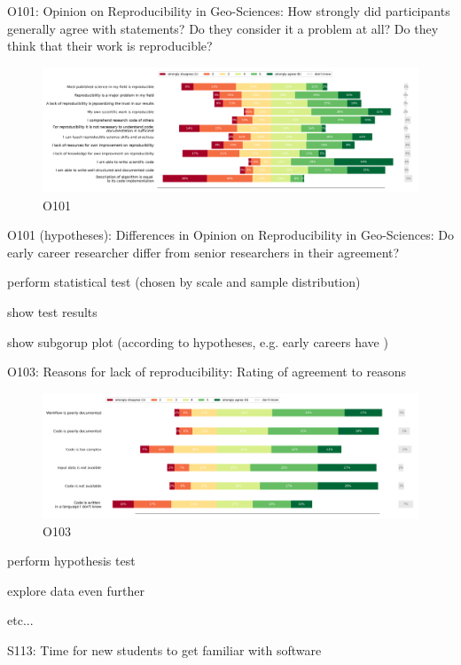 \documentclass{article}
\begin{document}
O101: Opinion on Reproducibility in Geo-Sciences: How strongly did participants generally agree with statements?
Do they consider it a problem at all? Do they think that their work is reproducible?

\begin{figure}[h!]
    \centering
    \includegraphics[width=\textwidth]{../figs/O101.png}
	\caption{O101 }
    \label{fig:O101}
\end{figure}



O101 (hypotheses): Differences in Opinion on Reproducibility in Geo-Sciences: Do early career researcher differ from senior researchers in their agreement?

 perform statistical test (chosen by scale and sample distribution)

 show test results

 show subgorup plot (according to hypotheses, e.g. early careers have )

O103: Reasons for lack of reproducibility: Rating of agreement to reasons

\begin{figure}[h!]
    \centering
    \includegraphics[width=\textwidth]{../figs/O103.png}
	\caption{O103 }
    \label{fig:O103}
\end{figure}

 perform hypothesis test

 explore data even further

 etc...

S113: Time for new students to get familiar with software
\end{document}
